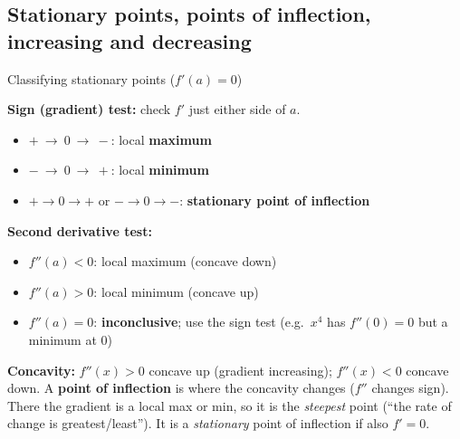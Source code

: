 \begin{cols}[0.53]
\end{cols}

\subsection{Stationary points, points of inflection, increasing and decreasing}
\label{sec:sp}

\begin{keyres}{Classifying stationary points ($f'(a)=0$)}
\begin{cols}
\textbf{Sign (gradient) test:} check $f'$ just either side of $a$.
\begin{itemize}
  \item $+\ \to\ 0\ \to\ -$: local \textbf{maximum}
  \item $-\ \to\ 0\ \to\ +$: local \textbf{minimum}
  \item $+\to0\to+$ or $-\to0\to-$: \textbf{stationary point of inflection}
\end{itemize}
\nextcol
\textbf{Second derivative test:}
\begin{itemize}
  \item $f''(a)<0$: local maximum (concave down)
  \item $f''(a)>0$: local minimum (concave up)
  \item $f''(a)=0$: \textbf{inconclusive}; use the sign test (e.g.\ $x^4$ has $f''(0)=0$ but a minimum at $0$)
\end{itemize}
\end{cols}
\textbf{Concavity:} $f''(x)>0$ concave up (gradient increasing); $f''(x)<0$ concave down. A \textbf{point of inflection} is where the concavity changes ($f''$ changes sign). There the gradient is a local max or min, so it is the \emph{steepest} point (``the rate of change is greatest/least''). It is a \emph{stationary} point of inflection if also $f'=0$.
\end{keyres}

